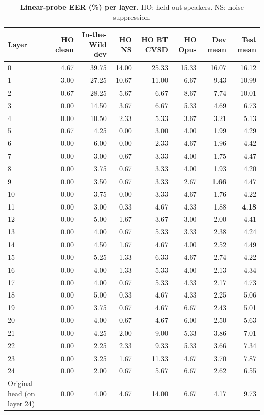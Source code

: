 \documentclass[10pt,a4paper,twocolumn]{article}
\begin{document}
\begin{table}[H]
\centering\small
\caption{\textbf{Linear-probe EER (\%) per layer.} HO: held-out speakers. NS: noise suppression.}
\label{tab:layers}
\begin{tabular}{@{}lrrrrrrr@{}}
\toprule
\textbf{Layer} & \textbf{HO clean} & \textbf{In-the-Wild dev} & \textbf{HO NS} & \textbf{HO BT CVSD} & \textbf{HO Opus} & \textbf{Dev mean} & \textbf{Test mean}\\
\midrule
0 & 4.67 & 39.75 & 14.00 & 25.33 & 15.33 & 16.07 & 16.12\\
1 & 3.00 & 27.25 & 10.67 & 11.00 & 6.67 & 9.43 & 10.99\\
2 & 0.67 & 28.25 & 5.67 & 6.67 & 8.67 & 7.74 & 10.01\\
3 & 0.00 & 14.50 & 3.67 & 6.67 & 5.33 & 4.69 & 6.73\\
4 & 0.00 & 10.50 & 2.33 & 5.33 & 3.67 & 3.21 & 5.13\\
5 & 0.67 & 4.25 & 0.00 & 3.00 & 4.00 & 1.99 & 4.29\\
6 & 0.00 & 6.00 & 0.00 & 2.33 & 4.67 & 1.96 & 4.42\\
7 & 0.00 & 3.00 & 0.67 & 3.33 & 4.00 & 1.75 & 4.47\\
8 & 0.00 & 3.75 & 0.67 & 3.33 & 4.00 & 1.93 & 4.20\\
9 & 0.00 & 3.50 & 0.67 & 3.33 & 2.67 & \textbf{1.66} & 4.47\\
10 & 0.00 & 3.75 & 0.00 & 3.33 & 4.67 & 1.76 & 4.22\\
11 & 0.00 & 3.00 & 0.33 & 4.67 & 4.33 & 1.88 & \textbf{4.18}\\
12 & 0.00 & 5.00 & 1.67 & 3.67 & 3.00 & 2.00 & 4.41\\
13 & 0.00 & 4.00 & 0.67 & 5.33 & 3.33 & 2.38 & 4.24\\
14 & 0.00 & 4.50 & 1.67 & 4.67 & 4.00 & 2.52 & 4.49\\
15 & 0.00 & 5.25 & 1.33 & 6.33 & 4.67 & 2.74 & 4.22\\
16 & 0.00 & 4.00 & 1.33 & 5.33 & 4.00 & 2.13 & 4.34\\
17 & 0.00 & 4.00 & 0.67 & 5.33 & 4.33 & 2.17 & 4.73\\
18 & 0.00 & 5.00 & 0.33 & 4.67 & 4.33 & 2.25 & 5.06\\
19 & 0.00 & 3.75 & 0.67 & 4.67 & 6.67 & 2.43 & 5.01\\
20 & 0.00 & 4.00 & 0.67 & 4.67 & 6.00 & 2.50 & 5.63\\
21 & 0.00 & 4.25 & 2.00 & 9.00 & 5.33 & 3.86 & 7.01\\
22 & 0.00 & 2.25 & 2.33 & 9.33 & 5.33 & 3.66 & 7.34\\
23 & 0.00 & 3.25 & 1.67 & 11.33 & 4.67 & 3.70 & 7.87\\
24 & 0.00 & 2.00 & 0.67 & 5.67 & 6.67 & 2.62 & 6.55\\
\midrule
Original head (on layer 24) & 0.00 & 4.00 & 4.67 & 14.00 & 6.67 & 4.17 & 9.73\\
\bottomrule
\end{tabular}
\end{table}
\end{document}
